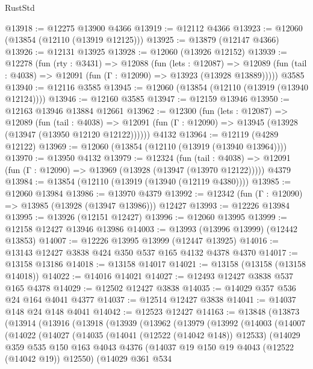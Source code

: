 \begin{lexlean}{RustStd}
\begin{coremodule}
@13918 := @12275 @13900 @4366
@13919 := @12112 @4366
@13923 := @12060 (@13854 (@12110 (@13919 @12125)))
@13925 := @13879 (@12147 @4366)
@13926 := @12131 @13925
@13928 := @12060 (@13926 @12152)
@13939 := @12278
    (fun (rty : @3431) =>
    @12088
      (fun (lets : @12087) =>
      @12089 (fun (tail : @4038) => @12091 (fun (Γ : @12090) => @13923 (@13928 @13889)))))
    @3585
@13940 := @12116 @3585
@13945 := @12060 (@13854 (@12110 (@13919 (@13940 @12124))))
@13946 := @12160 @3585
@13947 := @12159 @13946
@13950 := @12163 @13946 @13884 @12661
@13962 := @12300
    (fun (lets : @12087) =>
    @12089
      (fun (tail : @4038) =>
      @12091 (fun (Γ : @12090) => @13945 (@13928 (@13947 (@13950 @12120 @12122))))))
    @4132
@13964 := @12119 (@4289 @12122)
@13969 := @12060 (@13854 (@12110 (@13919 (@13940 @13964))))
@13970 := @13950 @4132
@13979 := @12324
    (fun (tail : @4038) => @12091 (fun (Γ : @12090) => @13969 (@13928 (@13947 (@13970 @12122)))))
    @4379
@13984 := @13854 (@12110 (@13919 (@13940 (@12119 @4380))))
@13985 := @12060 @13984
@13986 := @13970 @4379
@13992 := @12342 (fun (Γ : @12090) => @13985 (@13928 (@13947 @13986))) @12427
@13993 := @12226 @13984
@13995 := @13926 (@12151 @12427)
@13996 := @12060 @13995
@13999 := @12158 @12427 @13946 @13986
@14003 := @13993 (@13996 @13999) (@12442 @13853)
@14007 := @12226 @13995 @13999 (@12447 @13925)
@14016 := @13143 @12427 @3838 @424 @350 @537 @165 @4132 @4378 @4370
@14017 := @13158 @13186
@14018 := @13158 @14017
@14021 := @13158 (@13158 (@13158 @14018))
@14022 := @14016 @14021
@14027 := @12493 @12427 @3838 @537 @165 @4378
@14029 := @12502 @12427 @3838
@14035 := @14029 @357 @536 @24 @164 @4041 @4377
@14037 := @12514 @12427 @3838
@14041 := @14037 @148 @24 @148 @4041
@14042 := @12523 @12427
@14163 := @13848
    (@13873
      (@13914
        (@13916
          (@13918
            (@13939
              (@13962
                (@13979
                  (@13992
                    (@14003
                      (@14007
                        (@14022
                          (@14027
                            (@14035
                              (@14041 (@12522 (@14042 @148)) @12533)
                              (@14029
                                @359
                                @535
                                @150
                                @163
                                @4043
                                @4376
                                (@14037 @19 @150 @19 @4043 (@12522 (@14042 @19)) @12550)
                                (@14029
                                  @361
                                  @534

\end{coremodule}
\end{lexlean}
